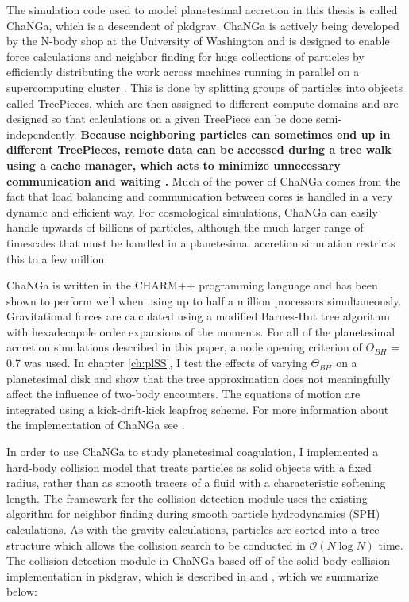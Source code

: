 The simulation code used to model planetesimal accretion in this thesis is called {\sc ChaNGa}, which is a descendent of {\sc pkdgrav}. {\sc ChaNGa} is actively being developed by the N-body shop at the University of Washington and is designed to enable force calculations and neighbor finding for huge collections of particles by efficiently distributing the work across machines running in parallel on a supercomputing cluster \cite{jetley08, menon15}. This is done by splitting groups of particles into objects called TreePieces, which are then assigned to different compute domains and are designed so that calculations on a given TreePiece can be done semi-independently. \textbf{Because neighboring particles can sometimes end up in different TreePieces, remote data can be accessed during a tree walk using a cache manager, which acts to minimize unnecessary communication and waiting \cite{menon15}.} Much of the power of {\sc ChaNGa} comes from the fact that load balancing and communication between cores is handled in a very dynamic and efficient way. For cosmological simulations, {\sc ChaNGa} can easily handle upwards of billions of particles, although the much larger range of timescales that must be handled in a planetesimal accretion simulation restricts this to a few million.

{\sc ChaNGa} is written in the {\sc CHARM++} programming language and has been shown to perform well when using up to half a million processors \cite{menon15} simultaneously. Gravitational forces are calculated using a modified Barnes-Hut tree algorithm with hexadecapole order expansions of the moments. For all of the planetesimal accretion simulations described in this paper, a node opening criterion of $\Theta_{BH}$ = 0.7 was used. In chapter \ref{ch:plSS}, I test the effects of varying $\Theta_{BH}$ on a planetesimal disk and show that the tree approximation does not meaningfully affect the influence of two-body encounters. The equations of motion are integrated using a kick-drift-kick leapfrog scheme. For more information about the implementation of {\sc ChaNGa} see \cite{jetley08}.

In order to use {\sc ChaNGa} to study planetesimal coagulation, I implemented a hard-body collision model that treats particles as solid objects with a fixed radius, rather than as smooth tracers of a fluid with a characteristic softening length. The framework for the collision detection module uses the existing algorithm for neighbor finding during smooth particle hydrodynamics (SPH) calculations. As with the gravity calculations, particles are sorted into a tree structure which allows the collision search to be conducted in $\mathcal{O}(N\log{}N)$ time. The collision detection module in {\sc ChaNGa} based off of the solid body collision implementation in {\sc pkdgrav}, which is described in \cite{richardson94} and \cite{richardson00}, which we summarize below:

